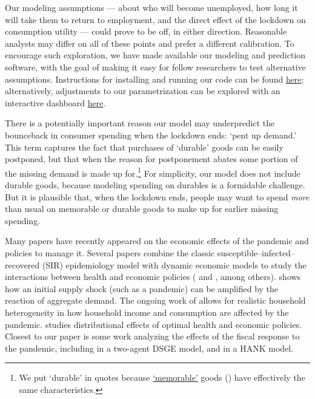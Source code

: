 \documentclass[titlepage,letterpaper]{\econtex}
\begin{document}
Our modeling assumptions --- about who will become unemployed, how long it will take them to return to employment, and the direct effect of the lockdown on consumption utility --- could prove to be off, in either direction.
Reasonable analysts may differ on all of these points and prefer a different calibration.
To encourage such exploration, we have made available our modeling and prediction software, with the goal of making it easy for fellow researchers to test alternative assumptions.
Instructions for installing and running our code can be found \href{https://github.com/econ-ark/Pandemic#reproduction-instructions}{here}; alternatively, adjustments to our parametrization can be explored with an interactive dashboard \href{http://econ-ark.org/pandemicdashboard}{here}.

There is a potentially important reason our model may underpredict the bounceback in consumer spending when the lockdown ends: `pent up demand.'
This term captures the fact that purchases of `durable' goods can be easily postponed, but that when the reason for postponement abates some portion of the missing demand is made up for.\footnote{We put `durable' in quotes because \href{https://www.nber.org/papers/w19386}{`memorable'} goods (\cite{hkpMemory}) have effectively the same characteristics.}
For simplicity, our model does not include durable goods, because modeling spending on durables is a formidable challenge.
But it is plausible that, when the lockdown ends, people may want to spend \textit{more} than usual on memorable or durable goods to make up for earlier missing spending.



Many papers have recently appeared on the economic effects of the pandemic and policies to manage it.
Several papers combine the classic susceptible--infected--recovered (SIR) epidemiology model with dynamic economic models to study the interactions between health and economic policies (\cite{ert_covid} and \cite{aal_covid}, among others).
\cite{covidMacroImpl} shows how an initial supply shock (such as a pandemic) can be amplified by the reaction of aggregate demand.
The ongoing work of \cite{kmv_pandemics} allows for realistic household heterogeneity in how household income and consumption are affected by the pandemic.
\cite{healthWealth} studies distributional effects of optimal health and economic policies.
Closest to our paper is some work analyzing the effects of the fiscal response to the pandemic, including \cite{faria_FPpandemic} in a two-agent DSGE model, and \cite{bayer_corona} in a HANK model.
\end{document}
